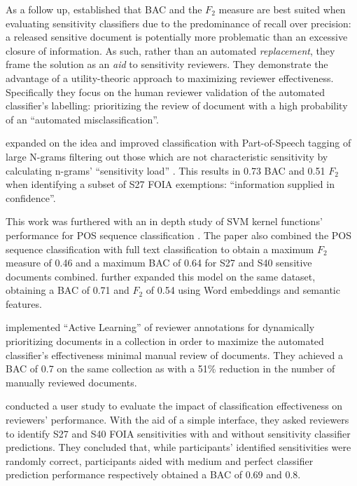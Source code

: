 \documentclass[\version]{l4proj}
\begin{document}
As a follow up, \textcite{berardiSemiAutomatedTextClassification2015} established that BAC and the \(F_{2}\) measure are best suited when evaluating sensitivity classifiers due to the predominance of recall over precision: a released sensitive document is potentially more problematic than an excessive closure of information.
As such, rather than an automated \textit{replacement}, they frame the solution as an \textit{aid} to sensitivity reviewers.
They demonstrate the advantage of a utility-theoric approach to maximizing reviewer effectiveness.
Specifically they focus on the human reviewer validation of the automated classifier's labelling: prioritizing the review of document with a high probability of an ``automated misclassification''.

\textcite{mcdonaldUsingPartofSpeechNgrams2015} expanded on the idea and improved classification with Part-of-Speech tagging of large N-grams filtering out those which are not characteristic sensitivity by calculating n-grams' ``sensitivity load'' \autocite[2]{mcdonaldUsingPartofSpeechNgrams2015}.
This results in 0.73 BAC and 0.51 \(F_{2}\) when identifying a subset of S27 FOIA exemptions: ``information supplied in confidence''.

This work was furthered with an in depth study of SVM kernel functions' performance for POS sequence classification \autocite{mcdonaldStudySVMKernel2017}.
The paper also combined the POS sequence classification with full text classification to obtain a maximum \(F_{2}\) measure of 0.46 and a maximum BAC of 0.64 for S27 and S40 sensitive documents combined.
\textcite{mcdonaldEnhancingSensitivityClassification2017} further expanded this model on the same dataset, obtaining a BAC of 0.71 and \(F_{2}\) of 0.54 using Word embeddings and semantic features.

\textcite{mcdonaldActiveLearningStrategies2018} implemented ``Active Learning'' of reviewer annotations for dynamically prioritizing documents in a collection in order to maximize the automated classifier's effectiveness minimal manual review of documents.
They achieved a BAC of 0.7 on the same collection as \textcite{mcdonaldStudySVMKernel2017,mcdonaldEnhancingSensitivityClassification2017} with a 51\% reduction in the number of manually reviewed documents.

\textcite{mcdonaldHowSensitivityClassification2019} conducted a user study to evaluate the impact of classification effectiveness on reviewers' performance. With the aid of a simple interface, they asked reviewers to identify S27 and S40 FOIA sensitivities with and without sensitivity classifier predictions.
They concluded that, while participants' identified sensitivities were randomly correct, participants aided with medium and perfect classifier prediction performance respectively obtained a BAC of 0.69 and 0.8.
\end{document}
